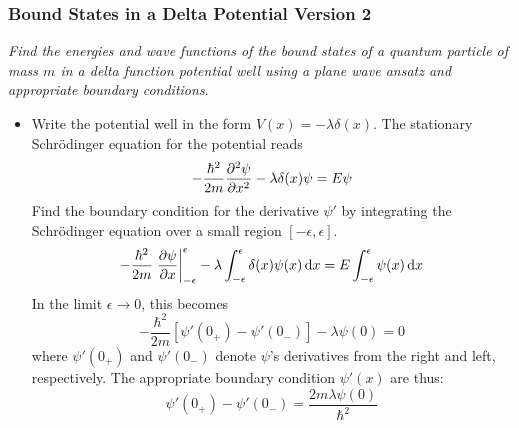 \documentclass[11pt, a4paper]{article}
\newcommand{\diff}{\mathop{}\!\mathrm{d}} %
\newcommand{\schro}{Schr\"{o}dinger\xspace}
\begin{document}
\subsubsection{Bound States in a Delta Potential Version 2}
\textit{Find the energies and wave functions of the bound states of a quantum particle of mass $ m $ in a delta function potential well using a plane wave ansatz and appropriate boundary conditions}. 
\begin{itemize}
	\item Write the potential well in the form $ V(x) = - \lambda \delta (x) $. The stationary \schro equation for the potential reads
	\begin{equation*}
		- \frac{\hbar^{2}}{2m}\pdv[2]{\psi}{x} - \lambda \delta(x) \psi = E\psi
	\end{equation*}
	Find the boundary condition for the derivative $ \psi' $ by integrating the \schro equation over a small region $ [-\epsilon, \epsilon] $. 
	\begin{equation*}
		-\frac{\hbar^{2}}{2m} \eval{\pdv{\psi}{x}}_{-\epsilon}^{\epsilon} - \lambda \int_{-\epsilon}^{\epsilon} \delta(x) \psi(x)\diff x = E \int_{-\epsilon}^{\epsilon}\psi(x) \diff x
	\end{equation*}
	In the limit $ \epsilon \to 0 $, this becomes
	\begin{equation*}
		-\frac{\hbar^{2}}{2m} \left[\psi'(0_{+}) - \psi'(0_{-})\right] - \lambda \psi(0) = 0
	\end{equation*}
	where $ \psi'(0_{+}) $ and $ \psi'(0_{-}) $ denote $ \psi $'s derivatives from the right and left, respectively. The appropriate boundary condition $ \psi'(x) $ are thus:
	\begin{equation*}
		\psi'(0_{+}) - \psi'(0_{-}) = \frac{2m\lambda\psi(0)}{\hbar^{2}}
	\end{equation*}
	

\end{itemize}
\end{document}
